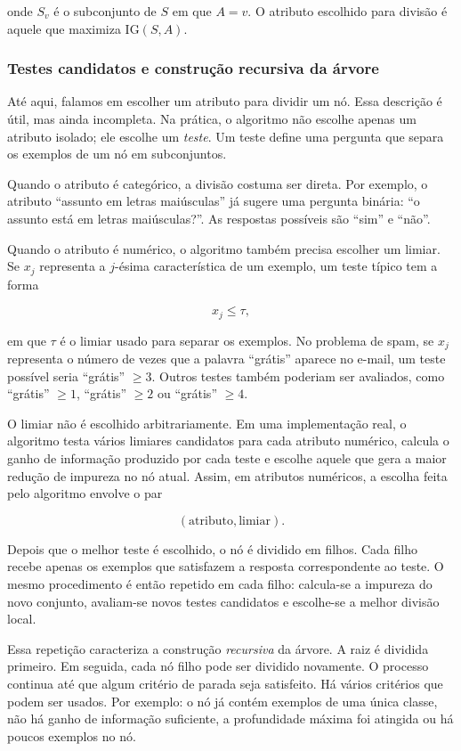 \documentclass[12pt,a4paper]{article}
\begin{document}
onde $S_v$ é o subconjunto de $S$ em que $A = v$. O atributo escolhido para divisão é aquele que maximiza $\text{IG}(S, A)$.

\subsubsection{Testes candidatos e construção recursiva da árvore}

Até aqui, falamos em escolher um atributo para dividir um nó. Essa descrição é
útil, mas ainda incompleta. Na prática, o algoritmo não escolhe apenas um
atributo isolado; ele escolhe um \emph{teste}. Um teste define uma pergunta que
separa os exemplos de um nó em subconjuntos.

Quando o atributo é categórico, a divisão costuma ser direta. Por exemplo, o
atributo ``assunto em letras maiúsculas'' já sugere uma pergunta binária:
``o assunto está em letras maiúsculas?''. As respostas possíveis são ``sim'' e
``não''.

Quando o atributo é numérico, o algoritmo também precisa escolher um limiar. Se
$x_j$ representa a $j$-ésima característica de um exemplo, um teste típico tem a
forma

\[
x_j \leq \tau,
\]

em que $\tau$ é o limiar usado para separar os exemplos. No problema de spam, se
$x_j$ representa o número de vezes que a palavra ``grátis'' aparece no e-mail,
um teste possível seria ``grátis'' $\geq 3$. Outros testes também poderiam ser
avaliados, como ``grátis'' $\geq 1$, ``grátis'' $\geq 2$ ou ``grátis'' $\geq 4$.

O limiar não é escolhido arbitrariamente. Em uma implementação real, o algoritmo
testa vários limiares candidatos para cada atributo numérico, calcula o ganho de
informação produzido por cada teste e escolhe aquele que gera a maior redução de
impureza no nó atual. Assim, em atributos numéricos, a escolha feita pelo
algoritmo envolve o par

\[
(\text{atributo}, \text{limiar}).
\]

Depois que o melhor teste é escolhido, o nó é dividido em filhos. Cada filho recebe apenas os exemplos que satisfazem a resposta correspondente ao teste. O mesmo procedimento é então repetido em cada filho: calcula-se a impureza do novo conjunto, avaliam-se novos testes candidatos e escolhe-se a melhor divisão local.

Essa repetição caracteriza a construção \emph{recursiva} da árvore. A raiz é dividida primeiro. Em seguida, cada nó filho pode ser dividido novamente. O processo continua até que algum critério de parada seja satisfeito. Há vários critérios que podem ser usados. Por exemplo: o nó já contém exemplos de uma única classe, não há ganho de informação suficiente, a profundidade máxima foi atingida ou há poucos exemplos no nó.
\end{document}
